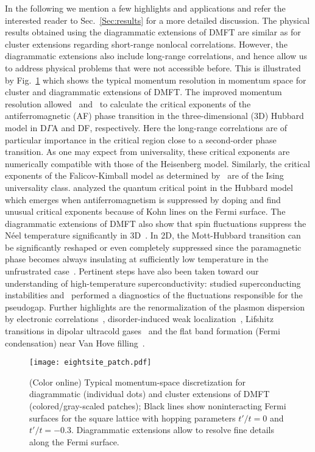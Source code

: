 \documentclass[rmp,aps,reprint,amsmath,amssymb,superscriptaddress,showpacs,nofootinbib]{revtex4-1}
\begin{document}
In the following we mention a few highlights and applications and refer the interested reader to Sec.~\ref{Sec:results} for a more detailed discussion. The physical results obtained using the diagrammatic extensions of DMFT are similar as for cluster extensions regarding short-range nonlocal correlations. However, the diagrammatic extensions also include long-range correlations, and hence allow us to address physical problems that were not accessible before. This is illustrated by Fig.~\ref{fig:dcapatches} which shows the typical momentum resolution in momentum space for cluster and diagrammatic extensions of DMFT. The improved momentum resolution allowed~ and~ to calculate the critical exponents of the antiferromagnetic (AF) phase transition in the three-dimensional (3D) Hubbard model in D$\Gamma$A and DF, respectively. Here the long-range correlations are of particular importance in the critical region close to a second-order phase transition. As one may expect from universality, these critical exponents are numerically compatible with those of the Heisenberg model. Similarly, the critical exponents of the Falicov-Kimball model as determined by~ are of the Ising universality class.   analyzed the quantum critical point in the Hubbard model which emerges when antiferromagnetism is suppressed by doping and find unusual critical exponents because of Kohn lines on the Fermi surface. The diagrammatic extensions of DMFT also show that spin fluctuations suppress the N\'eel temperature significantly in 3D~\cite{Katanin2009,Rohringer2011,Otsuki2014}. In 2D, the Mott-Hubbard transition can be significantly reshaped or even completely suppressed since the paramagnetic phase becomes always insulating at sufficiently low temperature in the unfrustrated case~\cite{Schaefer2015-2}. Pertinent steps have also been taken toward our understanding of high-temperature superconductivity:  studied superconducting instabilities and~ performed a diagnostics of the fluctuations responsible for the pseudogap. Further highlights are the renormalization of the plasmon dispersion by electronic correlations~\cite{vanLoon2014}, disorder-induced weak localization~\cite{Yang2014}, Lifshitz transitions in dipolar ultracold gases~\cite{vanLoon2016-2} and the flat band formation (Fermi condensation) near Van Hove filling~\cite{Yudin2014}.

\begin{figure}[t]
  \texttt{[image: eightsite\_patch.pdf]} 
    \caption{(Color online) Typical momentum-space discretization for diagrammatic (individual dots) and cluster extensions of DMFT (colored/gray-scaled patches); Black lines show noninteracting Fermi surfaces for the square lattice with hopping parameters $t'/t=0$ and $t'/t=-0.3$. Diagrammatic extensions allow to resolve fine details along the Fermi surface.}
  \label{fig:dcapatches}
\end{figure}
\end{document}
